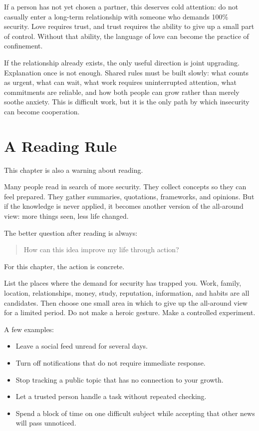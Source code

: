 If a person has not yet chosen a partner, this deserves cold attention: do not casually enter a long-term relationship with someone who demands 100\% security. Love requires trust, and trust requires the ability to give up a small part of control. Without that ability, the language of love can become the practice of confinement.

If the relationship already exists, the only useful direction is joint upgrading. Explanation once is not enough. Shared rules must be built slowly: what counts as urgent, what can wait, what work requires uninterrupted attention, what commitments are reliable, and how both people can grow rather than merely soothe anxiety. This is difficult work, but it is the only path by which insecurity can become cooperation.

\section*{A Reading Rule}

This chapter is also a warning about reading.

Many people read in search of more security. They collect concepts so they can feel prepared. They gather summaries, quotations, frameworks, and opinions. But if the knowledge is never applied, it becomes another version of the all-around view: more things seen, less life changed.

The better question after reading is always:

\begin{quote}
How can this idea improve my life through action?
\end{quote}

For this chapter, the action is concrete.

List the places where the demand for security has trapped you. Work, family, location, relationships, money, study, reputation, information, and habits are all candidates. Then choose one small area in which to give up the all-around view for a limited period. Do not make a heroic gesture. Make a controlled experiment.

A few examples:

\begin{itemize}
\item Leave a social feed unread for several days.
\item Turn off notifications that do not require immediate response.
\item Stop tracking a public topic that has no connection to your growth.
\item Let a trusted person handle a task without repeated checking.
\item Spend a block of time on one difficult subject while accepting that other news will pass unnoticed.
\end{itemize}

